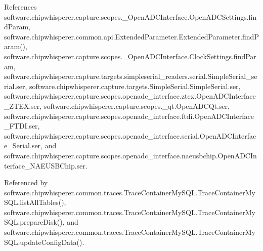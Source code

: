 References software.\+chipwhisperer.\+capture.\+scopes.\+\_\+\+Open\+A\+D\+C\+Interface.\+Open\+A\+D\+C\+Settings.\+find\+Param, software.\+chipwhisperer.\+common.\+api.\+Extended\+Parameter.\+Extended\+Parameter.\+find\+Param(), software.\+chipwhisperer.\+capture.\+scopes.\+\_\+\+Open\+A\+D\+C\+Interface.\+Clock\+Settings.\+find\+Param, software.\+chipwhisperer.\+capture.\+targets.\+simpleserial\+\_\+readers.\+serial.\+Simple\+Serial\+\_\+serial.\+ser, software.\+chipwhisperer.\+capture.\+targets.\+Simple\+Serial.\+Simple\+Serial.\+ser, software.\+chipwhisperer.\+capture.\+scopes.\+openadc\+\_\+interface.\+ztex.\+Open\+A\+D\+C\+Interface\+\_\+\+Z\+T\+E\+X.\+ser, software.\+chipwhisperer.\+capture.\+scopes.\+\_\+qt.\+Open\+A\+D\+C\+Qt.\+ser, software.\+chipwhisperer.\+capture.\+scopes.\+openadc\+\_\+interface.\+ftdi.\+Open\+A\+D\+C\+Interface\+\_\+\+F\+T\+D\+I.\+ser, software.\+chipwhisperer.\+capture.\+scopes.\+openadc\+\_\+interface.\+serial.\+Open\+A\+D\+C\+Interface\+\_\+\+Serial.\+ser, and software.\+chipwhisperer.\+capture.\+scopes.\+openadc\+\_\+interface.\+naeusbchip.\+Open\+A\+D\+C\+Interface\+\_\+\+N\+A\+E\+U\+S\+B\+Chip.\+ser.



Referenced by software.\+chipwhisperer.\+common.\+traces.\+Trace\+Container\+My\+S\+Q\+L.\+Trace\+Container\+My\+S\+Q\+L.\+list\+All\+Tables(), software.\+chipwhisperer.\+common.\+traces.\+Trace\+Container\+My\+S\+Q\+L.\+Trace\+Container\+My\+S\+Q\+L.\+prepare\+Disk(), and software.\+chipwhisperer.\+common.\+traces.\+Trace\+Container\+My\+S\+Q\+L.\+Trace\+Container\+My\+S\+Q\+L.\+update\+Config\+Data().


